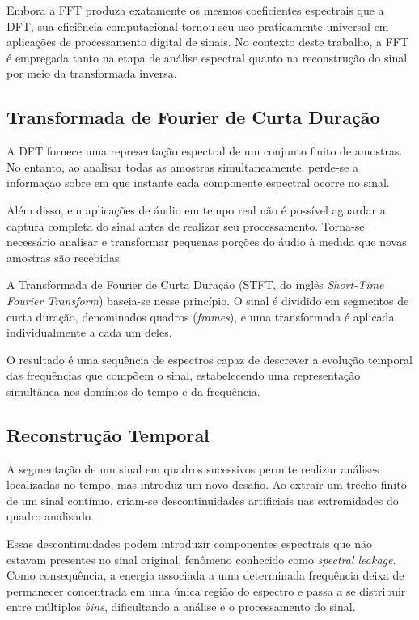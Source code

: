 Embora a FFT produza exatamente os mesmos coeficientes espectrais que a DFT, sua eficiência computacional tornou seu uso praticamente universal em aplicações de processamento digital de sinais. No contexto deste trabalho, a FFT é empregada tanto na etapa de análise espectral quanto na reconstrução do sinal por meio da transformada inversa.

\subsection{Transformada de Fourier de Curta Duração}

A DFT fornece uma representação espectral de um conjunto finito de amostras. No entanto, ao analisar todas as amostras simultaneamente, perde-se a informação sobre em que instante cada componente espectral ocorre no sinal.

Além disso, em aplicações de áudio em tempo real não é possível aguardar a captura completa do sinal antes de realizar seu processamento. Torna-se necessário analisar e transformar pequenas porções do áudio à medida que novas amostras são recebidas.

A Transformada de Fourier de Curta Duração (STFT, do inglês \textit{Short-Time Fourier Transform}) baseia-se nesse princípio. O sinal é dividido em segmentos de curta duração, denominados quadros (\textit{frames}), e uma transformada é aplicada individualmente a cada um deles.

O resultado é uma sequência de espectros capaz de descrever a evolução temporal das frequências que compõem o sinal, estabelecendo uma representação simultânea nos domínios do tempo e da frequência.

\subsection{Reconstrução Temporal}


A segmentação de um sinal em quadros sucessivos permite realizar análises localizadas no tempo, mas introduz um novo desafio. Ao extrair um trecho finito de um sinal contínuo, criam-se descontinuidades artificiais nas extremidades do quadro analisado.

Essas descontinuidades podem introduzir componentes espectrais que não estavam presentes no sinal original, fenômeno conhecido como \textit{spectral leakage}. Como consequência, a energia associada a uma determinada frequência deixa de permanecer concentrada em uma única região do espectro e passa a se distribuir entre múltiplos \textit{bins}, dificultando a análise e o processamento do sinal.

